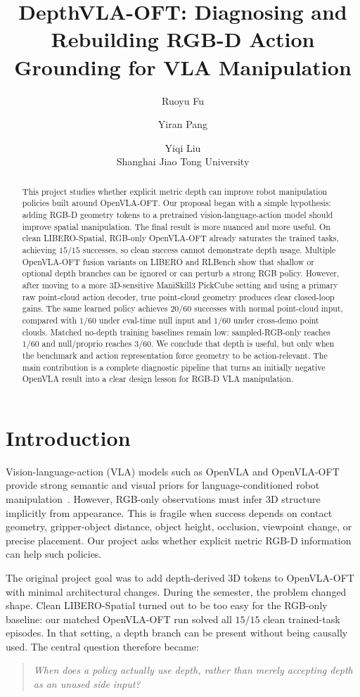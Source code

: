 \documentclass[conference]{IEEEtran}
\title{DepthVLA-OFT: Diagnosing and Rebuilding RGB-D Action Grounding for VLA Manipulation}
\author{Ruoyu Fu \and Yiran Pang \and Yiqi Liu\\
Shanghai Jiao Tong University}
\begin{document}
\maketitle

\begin{abstract}
This project studies whether explicit metric depth can improve robot manipulation policies built around OpenVLA-OFT. Our proposal began with a simple hypothesis: adding RGB-D geometry tokens to a pretrained vision-language-action model should improve spatial manipulation. The final result is more nuanced and more useful. On clean LIBERO-Spatial, RGB-only OpenVLA-OFT already saturates the trained tasks, achieving $15/15$ successes, so clean success cannot demonstrate depth usage. Multiple OpenVLA-OFT fusion variants on LIBERO and RLBench show that shallow or optional depth branches can be ignored or can perturb a strong RGB policy. However, after moving to a more 3D-sensitive ManiSkill3 PickCube setting and using a primary raw point-cloud action decoder, true point-cloud geometry produces clear closed-loop gains. The same learned policy achieves $20/60$ successes with normal point-cloud input, compared with $1/60$ under eval-time null input and $1/60$ under cross-demo point clouds. Matched no-depth training baselines remain low: sampled-RGB-only reaches $1/60$ and null/proprio reaches $3/60$. We conclude that depth is useful, but only when the benchmark and action representation force geometry to be action-relevant. The main contribution is a complete diagnostic pipeline that turns an initially negative OpenVLA result into a clear design lesson for RGB-D VLA manipulation.
\end{abstract}

\IEEEpeerreviewmaketitle

\section{Introduction}

Vision-language-action (VLA) models such as OpenVLA and OpenVLA-OFT provide strong semantic and visual priors for language-conditioned robot manipulation~\citep{kim2024openvla,kim2025oft}. However, RGB-only observations must infer 3D structure implicitly from appearance. This is fragile when success depends on contact geometry, gripper-object distance, object height, occlusion, viewpoint change, or precise placement. Our project asks whether explicit metric RGB-D information can help such policies.

The original project goal was to add depth-derived 3D tokens to OpenVLA-OFT with minimal architectural changes. During the semester, the problem changed shape. Clean LIBERO-Spatial turned out to be too easy for the RGB-only baseline: our matched OpenVLA-OFT run solved all $15/15$ clean trained-task episodes. In that setting, a depth branch can be present without being causally used. The central question therefore became:
\begin{quote}
\emph{When does a policy actually use depth, rather than merely accepting depth as an unused side input?}
\end{quote}
\end{document}
